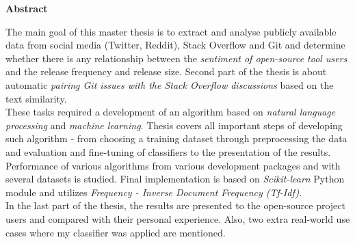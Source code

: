 \begin{center}
\textbf{Abstract}
\end{center}

The main goal of this master thesis is to extract and analyse publicly available data from social media (Twitter, Reddit), Stack Overflow and Git and determine whether there is any relationship between the \textit{sentiment of open-source tool users} and the release frequency and release size. Second part of the thesis is about automatic \textit{pairing Git issues with the Stack Overflow discussions} based on the text similarity.\\
These tasks required a development of an algorithm based on \textit{natural language processing} and \textit{machine learning}. Thesis covers all important steps of developing such algorithm - from choosing a training dataset through preprocessing the data and evaluation and fine-tuning of classifiers to the presentation of the results. Performance of various algorithms from various development packages and with several datasets is studied. Final implementation is based on \textit{Scikit-learn} Python module and utilizes \textit{Frequency - Inverse Document Frequency (Tf-Idf)}.\\
In the last part of the thesis, the results are presented to the open-source project users and compared with their personal experience. Also, two extra real-world use cases where my classifier was applied are mentioned.